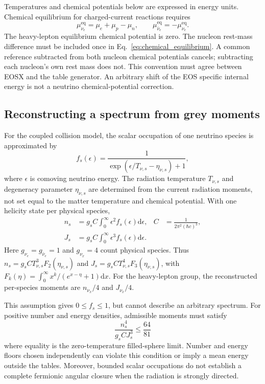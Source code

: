 \documentclass[aps,prd,reprint,nofootinbib,notitlepage]{revtex4-2}
\newcommand{\nue}{\nu_e}
\newcommand{\anue}{\bar{\nu}_e}
\newcommand{\nux}{\nu_x}
\newcommand{\dd}{\mathrm{d}}
\newcommand{\eq}{\mathrm{eq}}
\begin{document}
Temperatures and chemical potentials below are expressed in energy units.
Chemical equilibrium for charged-current reactions requires
\begin{equation}
 \mu_{\nue}^{\eq}=\mu_e+\mu_p-\mu_n,\qquad
 \mu_{\anue}^{\eq}=-\mu_{\nue}^{\eq}.
 \label{eq:chemical_equilibrium}
\end{equation}
The heavy-lepton equilibrium chemical potential is zero. The nucleon
rest-mass difference must be included once in Eq.~\eqref{eq:chemical_equilibrium}.
A common reference subtracted from both nucleon chemical potentials
cancels; subtracting each nucleon's own rest mass does not. This convention
must agree between EOSX and the table generator. An arbitrary shift of the
EOS specific internal energy is not a neutrino chemical-potential correction.

\subsection{Reconstructing a spectrum from grey moments}

For the coupled collision model, the scalar occupation of one neutrino
species is approximated by
\begin{equation}
 f_s(\epsilon)=\frac{1}{\exp(\epsilon/T_{\nu,s}-\eta_{\nu,s})+1},
 \label{eq:fd}
\end{equation}
where $\epsilon$ is comoving neutrino energy. The radiation temperature
$T_{\nu,s}$ and degeneracy parameter $\eta_{\nu,s}$ are determined from
the current radiation moments, not set equal to the matter temperature and
chemical potential. With one helicity state per physical species,
\begin{align}
 n_s&=g_s C\int_0^\infty\epsilon^2f_s(\epsilon)\dd\epsilon,
 & C&=\frac{1}{2\pi^2(\hbar c)^3},\label{eq:number_moment}\\
 J_s&=g_s C\int_0^\infty\epsilon^3f_s(\epsilon)\dd\epsilon.
 \label{eq:energy_moment}
\end{align}
Here $g_{\nue}=g_{\anue}=1$ and $g_{\nux}=4$ count physical species.
Thus $n_s=g_s CT_{\nu,s}^3F_2(\eta_{\nu,s})$ and
$J_s=g_s CT_{\nu,s}^4F_3(\eta_{\nu,s})$, with
$F_k(\eta)=\int_0^\infty x^k/(e^{x-\eta}+1)\dd x$.
For the heavy-lepton group, the reconstructed per-species moments are
$n_{\nux}/4$ and $J_{\nux}/4$.

This assumption gives $0\leq f_s\leq1$, but cannot describe an arbitrary
spectrum. For positive number and energy densities, admissible moments
must satisfy
\begin{equation}
 \frac{n_s^4}{g_s CJ_s^3}\leq\frac{64}{81}
 \label{eq:fd_bound}
\end{equation}
where equality is the zero-temperature filled-sphere limit. Number and
energy floors chosen independently can violate this
condition or imply a mean energy outside the tables. Moreover, bounded
scalar occupations do not establish a complete fermionic angular closure
when the radiation is strongly directed.
\end{document}
